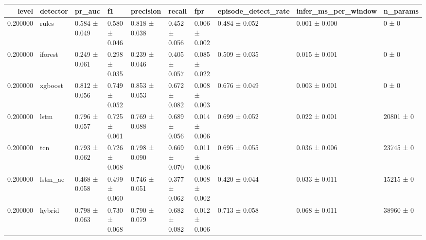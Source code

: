\begin{tabular}{rlllllllll}
\toprule
level & detector & pr\_auc & f1 & precision & recall & fpr & episode\_detect\_rate & infer\_ms\_per\_window & n\_params \\
\midrule
0.200000 & rules & 0.584 ± 0.049 & 0.580 ± 0.046 & 0.818 ± 0.038 & 0.452 ± 0.056 & 0.006 ± 0.002 & 0.484 ± 0.052 & 0.001 ± 0.000 & 0 ± 0 \\
0.200000 & iforest & 0.249 ± 0.061 & 0.298 ± 0.035 & 0.239 ± 0.046 & 0.405 ± 0.057 & 0.085 ± 0.022 & 0.509 ± 0.035 & 0.015 ± 0.001 & 0 ± 0 \\
0.200000 & xgboost & 0.812 ± 0.056 & 0.749 ± 0.052 & 0.853 ± 0.053 & 0.672 ± 0.082 & 0.008 ± 0.003 & 0.676 ± 0.049 & 0.003 ± 0.001 & 0 ± 0 \\
0.200000 & lstm & 0.796 ± 0.057 & 0.725 ± 0.061 & 0.769 ± 0.088 & 0.689 ± 0.056 & 0.014 ± 0.006 & 0.699 ± 0.052 & 0.022 ± 0.001 & 20801 ± 0 \\
0.200000 & tcn & 0.793 ± 0.062 & 0.726 ± 0.068 & 0.798 ± 0.090 & 0.669 ± 0.070 & 0.011 ± 0.006 & 0.695 ± 0.055 & 0.036 ± 0.006 & 23745 ± 0 \\
0.200000 & lstm\_ae & 0.468 ± 0.058 & 0.499 ± 0.060 & 0.746 ± 0.051 & 0.377 ± 0.062 & 0.008 ± 0.002 & 0.420 ± 0.044 & 0.033 ± 0.011 & 15215 ± 0 \\
0.200000 & hybrid & 0.798 ± 0.063 & 0.730 ± 0.068 & 0.790 ± 0.079 & 0.682 ± 0.082 & 0.012 ± 0.006 & 0.713 ± 0.058 & 0.068 ± 0.011 & 38960 ± 0 \\
\bottomrule
\end{tabular}
